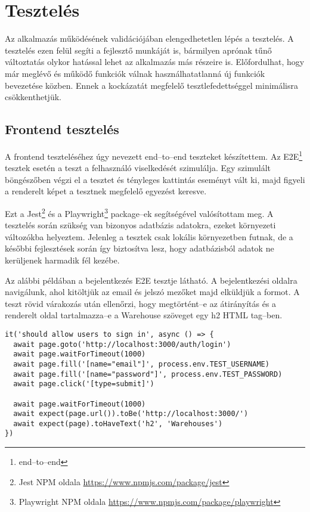 \chapter{Tesztelés}

Az alkalmazás működésének validációjában elengedhetetlen lépés a tesztelés.
A tesztelés ezen felül segíti a fejlesztő munkáját is, bármilyen aprónak tűnő változtatás olykor hatással lehet az alkalmazás más részeire is.
Előfordulhat, hogy már meglévő és működő funkciók válnak használhatatlanná új funkciók bevezetése közben.
Ennek a kockázatát megfelelő tesztlefedettséggel minimálisra csökkenthetjük.

\section{Frontend tesztelés}

A frontend teszteléséhez úgy nevezett end–to–end teszteket készítettem.
Az E2E\footnote{end–to–end} tesztek esetén a teszt a felhasználó viselkedését szimulálja.
Egy szimulált böngészőben végzi el a tesztet és tényleges kattintás eseményt vált ki, majd figyeli a renderelt képet a tesztnek megfelelő egyezést keresve.

Ezt a Jest\footnote{Jest NPM oldala \url{https://www.npmjs.com/package/jest}} és a Playwright\footnote{Playwright NPM oldala \url{https://www.npmjs.com/package/playwright}} package–ek segítségével valósítottam meg.
A tesztelés során szükség van bizonyos adatbázis adatokra, ezeket környezeti változókba helyeztem.
Jelenleg a tesztek csak lokális környezetben futnak, de a későbbi fejlesztések során így biztosítva lesz, hogy adatbázisból adatok ne kerüljenek harmadik fél kezébe.

Az alábbi példában a bejelentkezés E2E tesztje látható. A bejelentkezési oldalra navigálunk, ahol kitöltjük az email és jelszó mezőket majd elküldjük a formot. A teszt rövid várakozás után ellenőrzi, hogy megtörtént–e az átirányítás és a renderelt oldal tartalmazza–e a Warehouse szöveget egy h2 HTML tag–ben.

\begin{lstlisting}[style=ES6]
it('should allow users to sign in', async () => {
  await page.goto('http://localhost:3000/auth/login')
  await page.waitForTimeout(1000)
  await page.fill('[name="email"]', process.env.TEST_USERNAME)
  await page.fill('[name="password"]', process.env.TEST_PASSWORD)
  await page.click('[type=submit]')

  await page.waitForTimeout(1000)
  await expect(page.url()).toBe('http://localhost:3000/')
  await expect(page).toHaveText('h2', 'Warehouses')
})
\end{lstlisting}

